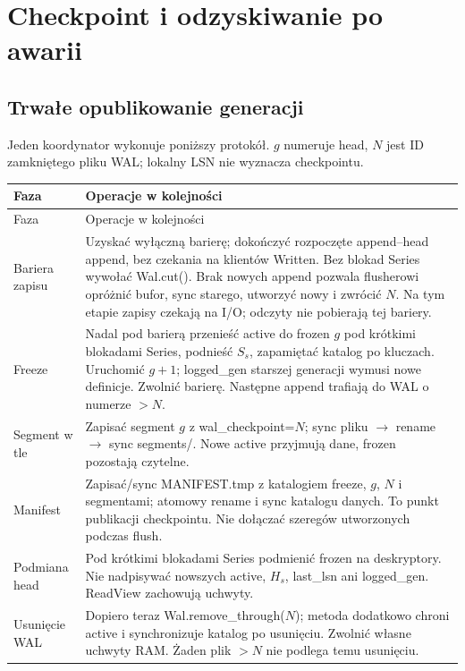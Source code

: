 \documentclass[11pt,a4paper]{article}
\newcommand{\tabhead}[1]{\toprule #1\\ \midrule\endfirsthead
  \toprule #1\\ \midrule\endhead \bottomrule\endfoot}
\begin{document}
\section{Checkpoint i odzyskiwanie po awarii}
\label{sec:checkpoint}

\subsection{Trwałe opublikowanie generacji}
Jeden koordynator wykonuje poniższy protokół. $g$ numeruje head,
$N$ jest ID zamkniętego pliku WAL; lokalny LSN nie wyznacza checkpointu.

\begin{longtable}{P{27mm}P{129mm}}
\tabhead{Faza & Operacje w kolejności}
Bariera zapisu &
Uzyskać wyłączną barierę; dokończyć rozpoczęte append--head append,
bez czekania na klientów Written. Bez blokad Series wywołać Wal.cut().
Brak nowych append pozwala flusherowi opróżnić bufor, sync starego,
utworzyć nowy i zwrócić $N$. Na tym etapie zapisy czekają na I/O;
odczyty nie pobierają tej bariery.\\
Freeze &
Nadal pod barierą przenieść active do frozen $g$ pod krótkimi
blokadami Series, podnieść $S_s$, zapamiętać katalog po kluczach.
Uruchomić $g+1$; logged\_gen starszej generacji wymusi nowe definicje.
Zwolnić barierę. Następne append trafiają do WAL o numerze $>N$.\\
Segment w tle &
Zapisać segment $g$ z wal\_checkpoint=$N$;
sync pliku $\rightarrow$ rename $\rightarrow$ sync segments/.
Nowe active przyjmują dane, frozen pozostają czytelne.\\
Manifest &
Zapisać/sync MANIFEST.tmp z katalogiem freeze, $g$, $N$ i segmentami;
atomowy rename i sync katalogu danych. To punkt publikacji checkpointu.
Nie dołączać szeregów utworzonych podczas flush.\\
Podmiana head &
Pod krótkimi blokadami Series podmienić frozen na deskryptory.
Nie nadpisywać nowszych active, $H_s$, last\_lsn ani logged\_gen.
ReadView zachowują uchwyty.\\
Usunięcie WAL &
Dopiero teraz Wal.remove\_through($N$); metoda dodatkowo chroni active
i synchronizuje katalog po usunięciu. Zwolnić własne uchwyty RAM.
Żaden plik $>N$ nie podlega temu usunięciu.\\
\end{longtable}
\end{document}
